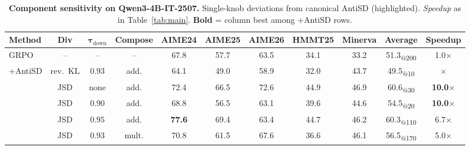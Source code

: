 \begin{table}[ht]
  \caption{\textbf{Component sensitivity on Qwen3-4B-IT-2507.} Single-knob deviations from canonical AntiSD (highlighted). \emph{Speedup} as in Table~\ref{tab:main}. \textbf{Bold} = column best among +AntiSD rows.}
  \vspace{-0.5em}
  \label{tab:ablation}
  \centering
  \small
  \setlength{\tabcolsep}{1.5pt}
  \renewcommand{\arraystretch}{0.95}
  \begin{tabular}{l|ccc|cccccc|c}
    \toprule
    \textbf{Method}          & \textbf{Div} & $\boldsymbol{\tau_{\mathrm{down}}}$ & \textbf{Compose}             & \textbf{AIME24} & \textbf{AIME25} & \textbf{AIME26} & \textbf{HMMT25} & \textbf{Minerva} & \textbf{Average}                                & \textbf{Speedup}      \\
    \midrule
    GRPO                     & --           & --                                  & --                           & 67.8            & 57.7            & 63.5            & 34.1            & 33.2             & 51.3\textsubscript{@200}                        & 1.0$\times$           \\
    \midrule
    \multirow{7}{*}{+AntiSD} & rev.~KL      & $0.93$                              & add.                         & 64.1            & 49.0            & 58.9            & 32.0            & 43.7             & 49.5\textsubscript{@10}                         & $\times$              \\
    \cmidrule{2-11}
                             & JSD          & none                                & add.                         & 72.4            & 66.5            & 72.6            & 44.9            & 46.9             & 60.6\textsubscript{@30}                         & \textbf{10.0$\times$} \\
                             & JSD          & $0.90$                              & add.                         & 68.8            & 56.5            & 63.1            & 39.6            & 44.6             & 54.5\textsubscript{@20}                         & \textbf{10.0$\times$} \\
                             & JSD          & $0.95$                              & add.                         & \textbf{77.6}   & 69.4            & 63.4            & 44.7            & 46.2             & 60.3\textsubscript{@110}                        & 6.7$\times$           \\
    \cmidrule{2-11}
                             & JSD          & $0.93$                              & mult.                        & 70.8            & 61.5            & 67.6            & 36.6            & 46.1             & 56.5\textsubscript{@170}                        & 5.0$\times$           \\

\end{tabular}
\end{table}
